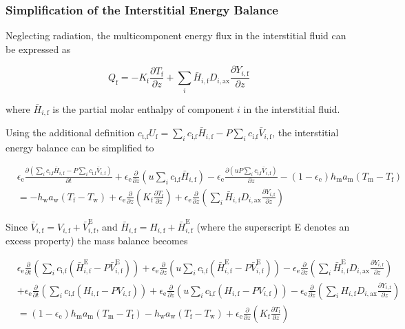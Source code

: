 \documentclass[11pt]{article}
\newcommand{\ee}{\epsilon_{\mathrm{e}}}
\newcommand{\textm}{\text{m}}
\newcommand{\textw}{\text{w}}
\newcommand{\textf}{\text{f}}
\newcommand{\ctf}{c_{\text{t,f}}}
\newcommand{\cif}{c_{\text{i,f}}}
\newcommand{\Diax}{D_{i,\text{ax}}}
\begin{document}
    \subsubsection{Simplification of the Interstitial Energy Balance}
    Neglecting radiation, the multicomponent energy flux in the interstitial fluid
    can be expressed as

    \begin{equation}
        Q_\textf = -K_\textf\frac{\partial T_\textf}{\partial z} + \sum_i \bar{H}_{i,\textf} D_{i,\text{ax}}\frac{\partial Y_{i,\textf}}{\partial z}
    \end{equation}

    where $\bar{H}_{i,\textf}$ is the partial molar enthalpy of component $i$ in the interstitial fluid.

    Using the additional definition $\ctf U_\textf=\sum_i\cif\bar{H}_{i,\textf}  - P\sum_i\cif\bar{V}_{i,\textf}$, the interstitial energy balance can be simplified to

    \begin{align}
        &\ee\frac{\partial (\sum_i\cif\bar{H}_{i,\textf} - P\sum_i\cif\bar{V}_{i,\textf})}{\partial t}
        + \ee\frac{\partial}{\partial z}\left(u\sum_i\cif\bar{H}_{i,\textf}\right)
        - \ee\frac{\partial (u P\sum_i\cif\bar{V}_{i,\textf})}{\partial z} -
        (1-\ee)h_\textm a_{\textm} (T_\textm - T_\textf)\nonumber\\
        &= - h_\textw a_{\textw} (T_\textf - T_\textw)
        + \ee\frac{\partial}{\partial z}\left(K_\textf\frac{\partial T_\textf}{\partial z}\right)
        + \ee\frac{\partial}{\partial z}\left(\sum_i \bar{H}_{i,\textf} D_{i,\text{ax}}\frac{\partial Y_{i,\textf}}{\partial z}\right)
    \end{align}

    Since $\bar{V}_{i,\textf}=V_{i,\textf}+\bar{V}_{i,\textf}^{\text{E}} $,
    and $\bar{H}_{i,\textf}=H_{i,\textf}+\bar{H}_{i,\textf}^{\text{E}}$ (where
    the superscript E denotes an excess property)
    the mass balance becomes

    \begin{align}
        &\ee\frac{\partial}{\partial t}\left(
            \sum_i\cif(\bar{H}_{i,\textf}^{\text{E}} - P\bar{V}_{i,\textf}^{\text{E}})
        \right)
        + \ee\frac{\partial}{\partial z}\left(
        u \sum_i \cif (\bar{H}_{i,\textf}^{\text{E}} - P\bar{V}_{i,\textf}^{\text{E}})
        \right)
        - \ee \frac{\partial}{\partial z}\left(\sum_i\bar{H}_{i,\textf}^{\text{E}}\Diax\frac{\partial Y_{i,\textf}}{\partial z}\right)
        \nonumber \\
        &+\ee\frac{\partial}{\partial t}\left(
            \sum_i\cif (H_{i,\textf} - PV_{i,\textf})
        \right)
        + \ee\frac{\partial}{\partial z}\left(
            u\sum_i \cif (H_{i,\textf}  - PV_{i,\textf})
        \right)
        - \ee \frac{\partial}{\partial z}\left(\sum_i H_{i,\textf}\Diax\frac{\partial Y_{i,\textf}}{\partial z}\right) \nonumber\\
        &= (1-\ee)h_{\textm}a_\textm(T_\textm - T_\textf) - h_\textw a_\textw(T_\textf - T_\textw) + \ee\frac{\partial}{\partial z}\left(K_\textf\frac{\partial T_{\textf}}{\partial z}\right)
    \end{align}
\end{document}
